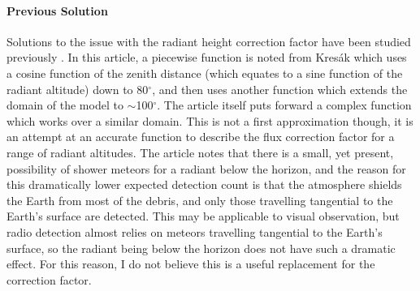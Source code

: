 \paragraph{Previous Solution}
Solutions to the issue with the radiant height correction factor have been studied previously \cite{hr_correction}. In this article, a piecewise function is noted from Kres\'{a}k \cite{kresak} which uses a cosine function of the zenith distance (which equates to a sine function of the radiant altitude) down to 80$^{\circ}$, and then uses another function which extends the domain of the model to $\sim$100$^{\circ}$. The article itself puts forward a complex function which works over a similar domain. This is not a first approximation though, it is an attempt at an accurate function to describe the flux correction factor for a range of radiant altitudes. The article notes that there is a small, yet present, possibility of shower meteors for a radiant below the horizon, and the reason for this dramatically lower expected detection count is that the atmosphere shields the Earth from most of the debris, and only those travelling tangential to the Earth's surface are detected. This may be applicable to visual observation, but radio detection almost relies on meteors travelling tangential to the Earth's surface, so the radiant being below the horizon does not have such a dramatic effect. For this reason, I do not believe this is a useful replacement for the correction factor.

